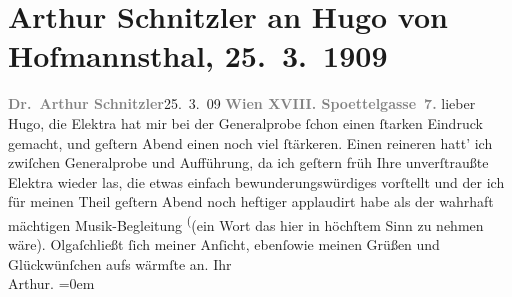 

         
         \newcommand{\erwaehntePersonen}{Personen: Hugo von Hofmannsthal, Olga Schnitzler, Richard Strauss}
         \newcommand{\erwaehnteOrte}{Orte: Edmund-Weiß-Gasse, Wien}
         \newcommand{\erwaehnteWerke}{Werke: Elektra (op. 58)}
               \section[Arthur Schnitzler an Hugo von Hofmannsthal, 25. 3. 1909]{ Arthur Schnitzler an Hugo von Hofmannsthal, 25. 3. 1909}\nopagebreak{}\rehead{ }\begin{ledgroupsized}[t]{13cm}\normalsize\beginnumbering \toendnotes[C]{\smallbreak\pagebreak[2]} 
\pstart
           \noindent{}{\pb}\textcolor{gray}{\textbf{Dr. Arthur
                        Schnitzler}}\hfill 25. 3. 09\pend
           \pstart
           \textcolor{gray}{\textbf{Wien XVIII. Spoettelgasse 7.}}\pend
           \pstart
           lieber Hugo, die Elektra hat mir
               bei der Generalprobe ſchon einen ſtarken Eindruck gemacht, und geſtern
                  Abend einen noch viel ſtärkeren. Einen reineren hatt’ ich zwiſchen
               Generalprobe und Aufführung, da ich geſtern früh Ihre unverſtraußte Elektra wieder las,
               die etwas einfach bewunderungs{\pb}würdiges vorſtellt und der
               ich für meinen Theil geſtern \introOben{}Abend\introOben{} noch
               heftiger applaudirt habe als der wahrhaft
               mächtigen Musik-Begleitung \substVorne{}\textsuperscript{(}\substDazwischen{}(ein Wort\substHinten{} das hier in höchſtem Sinn zu nehmen wäre).\pend
           \pstart
           Olgaſchließt ſich meiner Anſicht, ebenſowie meinen
               Grüßen und Glückwünſchen aufs wärmſte an.\pend
           \pstart
           Ihr{\\[\baselineskip]}\spacefill\mbox{Arthur.}\pend
           \leftskip=0em{}
         

\end{ledgroupsized}
